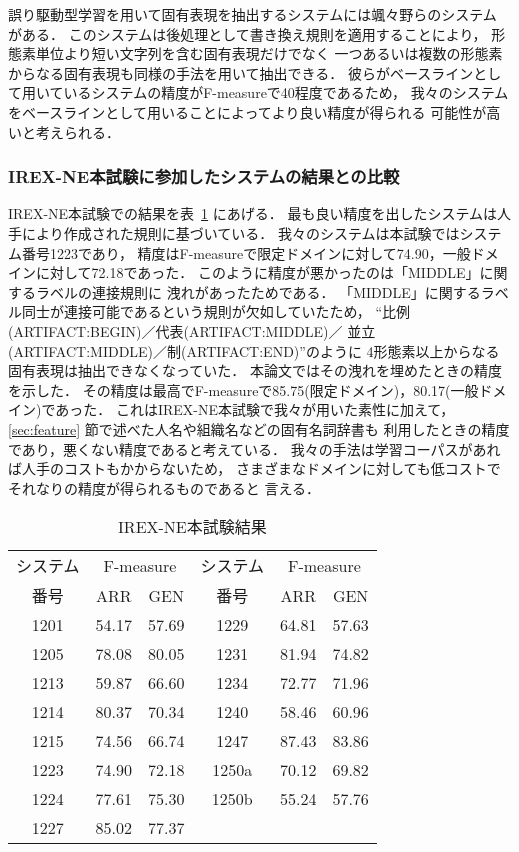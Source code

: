 誤り駆動型学習を用いて固有表現を抽出するシステムには颯々野らのシステム
\cite{Sassano:99}がある．
このシステムは後処理として書き換え規則を適用することにより，
形態素単位より短い文字列を含む固有表現だけでなく
一つあるいは複数の形態素からなる固有表現も同様の手法を用いて抽出できる．
彼らがベースラインとして用いているシステムの精度がF-measureで40程度であるため，
我々のシステムをベースラインとして用いることによってより良い精度が得られる
可能性が高いと考えられる．

\subsubsection{IREX-NE本試験に参加したシステムの結果との比較}

IREX-NE本試験での結果を表~\ref{table:formalrun_results} にあげる．
最も良い精度を出したシステムは人手により作成された規則に基づいている．
我々のシステムは本試験ではシステム番号1223であり，
精度はF-measureで限定ドメインに対して74.90，一般ドメインに対して72.18であった．
このように精度が悪かったのは「MIDDLE」に関するラベルの連接規則に
洩れがあったためである．
「MIDDLE」に関するラベル同士が連接可能であるという規則が欠如していたため，
``比例(ARTIFACT:BEGIN)／代表(ARTIFACT:MIDDLE)／
並立(ARTIFACT:MIDDLE)／制(ARTIFACT:END)''のように
4形態素以上からなる固有表現は抽出できなくなっていた．
本論文ではその洩れを埋めたときの精度を示した．
その精度は最高でF-measureで85.75(限定ドメイン)，80.17(一般ドメイン)であった．
これはIREX-NE本試験で我々が用いた素性に加えて，
\ref{sec:feature} 節で述べた人名や組織名などの固有名詞辞書も
利用したときの精度であり，悪くない精度であると考えている．
我々の手法は学習コーパスがあれば人手のコストもかからないため，
さまざまなドメインに対しても低コストでそれなりの精度が得られるものであると
言える．
{\scriptsize
\begin{table}[htbp]
  \begin{center}
    \caption{IREX-NE本試験結果}
    \label{table:formalrun_results} 
    \begin{tabular}{|c|c|c||c|c|c|}
      \hline
      システム & \multicolumn{2}{|c||}{F-measure} 
      & システム & \multicolumn{2}{|c|}{F-measure} \\
      \cline{2-3}\cline{5-6}
      番号 & ARR & GEN & 番号 & ARR & GEN \\
      \hline
      1201 & 54.17 & 57.69 & 1229 & 64.81 & 57.63 \\
      1205 & 78.08 & 80.05 & 1231 & 81.94 & 74.82 \\
      1213 & 59.87 & 66.60 & 1234 & 72.77 & 71.96 \\
      1214 & 80.37 & 70.34 & 1240 & 58.46 & 60.96 \\
      1215 & 74.56 & 66.74 & 1247 & 87.43 & 83.86 \\
      1223 & 74.90 & 72.18 & 1250a & 70.12 & 69.82 \\
      1224 & 77.61 & 75.30 & 1250b & 55.24 & 57.76 \\
      1227 & 85.02 & 77.37 & & & \\
      \hline
    \end{tabular}
  \end{center}
\end{table}
}

